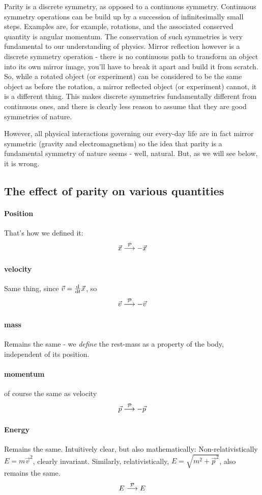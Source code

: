  Parity is a discrete symmetry, as opposed to a continuous
 symmetry. Continuous symmetry operations can be build up by a
 succession of infinitesimally small steps. Examples are, for example,
 rotations, and the associated conserved quantity is angular
 momentum. The conservation of such symmetries is very fundamental to
 our understanding of physics. Mirror reflection however is a discrete
 symmetry operation - there is no continuous path to transform an
 object into its own mirror image, you'll have to break it apart and
 build it from scratch. So, while a rotated object (or experiment) can be considered
 to be the same object as before the rotation, a mirror reflected
 object (or experiment) cannot, it is a different thing. This makes discrete
 symmetries fundamentally different from continuous ones, and there is
 clearly less reason to assume that they are good symmetries of
 nature.

 However, all physical interactions governing our every-day life are
 in fact mirror symmetric (gravity and electromagnetism) so the idea
 that parity is a fundamental symmetry of nature seems - well,
 natural. But, as we will see below, it is wrong. 

\subsection{The effect of parity on various quantities}

\paragraph{Position} That's how we defined it: 
\[ \vec{x} \stackrel{\mathcal{P}}{\longrightarrow} -\vec{x} \]
\paragraph{velocity} Same thing, since $\vec{v} = \frac{\mathrm{d}}{\mathrm{d}t} \vec{x}$, so
\[ \vec{v} \stackrel{\mathcal{P}}{\longrightarrow} -\vec{v} \]
\paragraph{mass} Remains the same - we \emph{define} the rest-mass as
 a property of the body, independent of its position.
\paragraph{momentum} of course the same as velocity
\[ \vec{p} \stackrel{\mathcal{P}}{\longrightarrow} -\vec{p} \]
\paragraph{Energy} Remains the same. Intuitively clear, but also
 mathematically: Non-relativistically \( E = m\vec{v}^2 \), clearly
 invariant.  Similarly, relativistically, \(E = \sqrt{ m^2 +
 \vec{p}^2}\), also remains the same.
\[ E \stackrel{\mathcal{P}}{\longrightarrow} E \]
